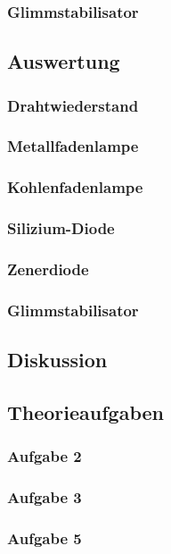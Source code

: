 \documentclass[12pt,a4paper]{article}
\begin{document}
\subsubsection*{Glimmstabilisator}


\subsection*{Auswertung}

\subsubsection*{Drahtwiederstand}

\subsubsection*{Metallfadenlampe}

\subsubsection*{Kohlenfadenlampe}

\subsubsection*{Silizium-Diode}

\subsubsection*{Zenerdiode}

\subsubsection*{Glimmstabilisator}


\subsection*{Diskussion}

\newpage
\subsection*{Theorieaufgaben}

\subsubsection*{Aufgabe 2}

\subsubsection*{Aufgabe 3}

\subsubsection*{Aufgabe 5}
\end{document}
